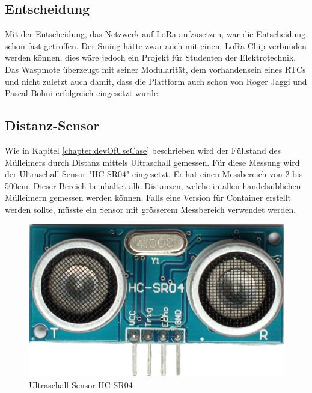 \subsection*{Entscheidung}
Mit der Entscheidung, das Netzwerk auf LoRa aufzusetzen, war die Entscheidung schon fast getroffen. Der Sming hätte zwar auch mit einem LoRa-Chip verbunden werden können, dies wäre jedoch ein Projekt für Studenten der Elektrotechnik. Das Waspmote überzeugt mit seiner Modularität, dem vorhandensein eines RTCs und nicht zuletzt auch damit, dass die Plattform auch schon von Roger Jaggi und Pascal Bohni erfolgreich eingesetzt wurde.

\subsection{Distanz-Sensor}
Wie in Kapitel \ref{chapter:devOfUseCase} beschrieben wird der Füllstand des Mülleimers durch Distanz mittels Ultraschall gemessen. Für diese Messung wird der Ultraschall-Sensor "HC-SR04" eingesetzt. Er hat einen Messbereich von 2 bis 500cm. Dieser Bereich beinhaltet alle Distanzen, welche in allen handelsüblichen Mülleimern gemessen werden können. Falls eine Version für Container erstellt werden sollte, müsste ein Sensor mit grösserem Messbereich verwendet werden. 
\begin{figure}[H]
     \centering
        \includegraphics[scale=0.3]{pictures/HC-SR04.png}
    \caption{Ultraschall-Sensor HC-SR04}
    \label{fig:HCSR04}
\end{figure}

